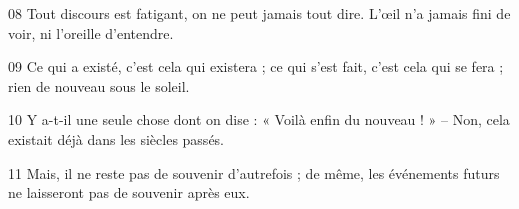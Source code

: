 
08 Tout discours est fatigant, on ne peut jamais tout dire. L’œil n’a jamais fini de voir, ni l’oreille d’entendre.

09 Ce qui a existé, c’est cela qui existera ; ce qui s’est fait, c’est cela qui se fera ; rien de nouveau sous le soleil.

10 Y a-t-il une seule chose dont on dise : « Voilà enfin du nouveau ! » – Non, cela existait déjà dans les siècles passés.

11 Mais, il ne reste pas de souvenir d’autrefois ; de même, les événements futurs ne laisseront pas de souvenir après eux.
